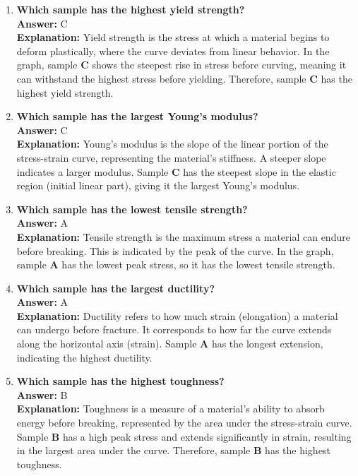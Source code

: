 \documentclass[10pt]{article}
\begin{document}
\begin{enumerate}
    \item[(a)] \textbf{Which sample has the highest yield strength?} \\
    \quad \textbf{Answer:} \quad C \\
    \textbf{Explanation:} Yield strength is the stress at which a material begins to deform plastically, where the curve deviates from linear behavior. In the graph, sample \textbf{C} shows the steepest rise in stress before curving, meaning it can withstand the highest stress before yielding. Therefore, sample \textbf{C} has the highest yield strength.

    \item[(b)] \textbf{Which sample has the largest Young's modulus?} \\
    \quad \textbf{Answer:} \quad C \\
    \textbf{Explanation:} Young’s modulus is the slope of the linear portion of the stress-strain curve, representing the material’s stiffness. A steeper slope indicates a larger modulus. Sample \textbf{C} has the steepest slope in the elastic region (initial linear part), giving it the largest Young’s modulus.

    \item[(c)] \textbf{Which sample has the lowest tensile strength?} \\
    \quad \textbf{Answer:} \quad A \\
    \textbf{Explanation:} Tensile strength is the maximum stress a material can endure before breaking. This is indicated by the peak of the curve. In the graph, sample \textbf{A} has the lowest peak stress, so it has the lowest tensile strength.

    \item[(d)] \textbf{Which sample has the largest ductility?} \\
    \quad \textbf{Answer:} \quad A \\
    \textbf{Explanation:} Ductility refers to how much strain (elongation) a material can undergo before fracture. It corresponds to how far the curve extends along the horizontal axis (strain). Sample \textbf{A} has the longest extension, indicating the highest ductility.

    \item[(e)] \textbf{Which sample has the highest toughness?} \\
    \quad \textbf{Answer:} \quad B \\
    \textbf{Explanation:} Toughness is a measure of a material's ability to absorb energy before breaking, represented by the area under the stress-strain curve. Sample \textbf{B} has a high peak stress and extends significantly in strain, resulting in the largest area under the curve. Therefore, sample \textbf{B} has the highest toughness.
\end{enumerate}
\end{document}
